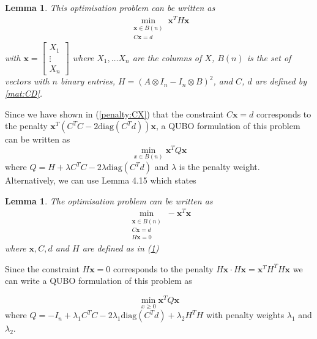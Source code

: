 \documentclass{article}
\newtheorem{lem}[prop]{Lemma}
\begin{document}
\begin{lem}\label{lem:qubo1}
    \cite[p.~8]{klus2023continuous} This optimisation problem can be written as \begin{align*}
    \min_{\substack{\mathbf{x} \in B(n) \\ C\mathbf{x} = d}} \mathbf{x}^T H\mathbf{x}
    \end{align*}
    with \(\mathbf{x} = \begin{bmatrix}
        X_1 \\
        \vdots \\
        X_n
    \end{bmatrix}\) where \(X_1, \dots X_n\) are the columns of \(X\), \(B(n)\) is the set of vectors with \(n\) binary entries, \(H = (A \otimes I_n - I_n \otimes B)^2\), and \(C\), \(d\) are defined by \ref{mat:CD}.
\end{lem}

\noindent Since we have shown in (\ref{penalty:CX}) that the constraint \(C\mathbf{x} = d\) corresponds to the penalty \(\mathbf{x}^T(C^T C - 2\text{diag}(C^T d))\mathbf{x}\), a QUBO formulation of this problem can be written as 
\begin{equation}\label{QUBO: graphIso1}
	\min_{x \in B(n)} \mathbf{x}^T Q \mathbf{x}
\end{equation}
where \(Q = H + \lambda C^T C - 2\lambda\text{diag}(C^T d)\) and \(\lambda\) is the penalty weight.\\

\noindent Alternatively, we can use Lemma 4.15 which states
\begin{lem}
	\cite[p.~13]{klus2023continuous} The optimisation problem can be written as \begin{align*}
		\min_{\substack{\mathbf{x} \in B(n) \\ C\mathbf{x} = d \\ H\mathbf{x}=0}} -\mathbf{x}^T\mathbf{x}
	\end{align*}
	where \(\mathbf{x}, C, d\) and \(H\) are defined as in (\ref{lem:qubo1})
\end{lem}

\noindent Since the constraint \(H\mathbf{x} = 0\) corresponds to the penalty \(H\mathbf{x} \cdot H\mathbf{x} =  \mathbf{x}^T H^T H  \mathbf{x}\) we can write a QUBO formulation of this problem as

\begin{equation}\label{QUBO: graphIso2}
	\min_{x \geq 0} \mathbf{x}^T Q \mathbf{x}
\end{equation}
where \(Q = -I_n + \lambda_1 C^T C - 2\lambda_1\text{diag}(C^T d) + \lambda_2 H^T H\) with penalty weights \(\lambda_1\) and \(\lambda_2\).\\
\end{document}
